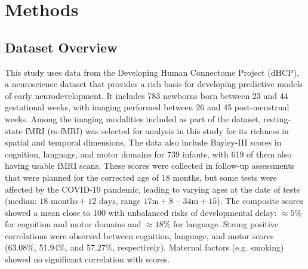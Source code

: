 \documentclass[runningheads,a4paper]{llncs}
\begin{document}

\section{Methods}
\label{sec:methods}

\subsection{Dataset Overview}
\label{sec:dataset}
This study uses data from the Developing Human Connectome Project (dHCP), a neuroscience dataset that provides a rich basis for developing predictive models of early neurodevelopment. It includes 783 newborns born between 23 and 44 gestational weeks, with imaging performed between 26 and 45 post-menstrual weeks. Among the imaging modalities included as part of the dataset, resting-state fMRI (rs-fMRI) was selected for analysis in this study for its richness in spatial and temporal dimensions. 
%
The data also include Bayley-III scores in cognition, language, and motor domains for 739 infants, with 619 of them also having usable fMRI scans. These scores were collected in follow-up assessments that were planned for the corrected age of 18 months, but some tests were affected by the COVID-19 pandemic, leading to varying ages at the date of tests (median: $18 \text{ months} + 12 \text{ days}$, range $17\text{m} + 8$ -- $34\text{m} + 15$). The composite scores showed a mean close to 100 with unbalanced risks of developmental delay: $\approx5\%$ for cognition and motor domains and $\approx18\%$ for language. Strong positive correlations were observed between cognition, language, and motor scores (63.08\%, 51.94\%, and 57.27\%, respectively). Maternal factors (e.g. smoking) showed no significant correlation with scores.
\end{document}
